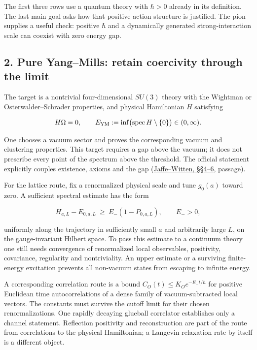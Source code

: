 \documentclass[11pt,a4paper]{article}
\begin{document}
The first three rows use a quantum theory with \(\hbar>0\) already in
its definition. The last main goal asks how that positive action
structure is justified. The pion supplies a useful check: positive
\(\hbar\) and a dynamically generated strong-interaction scale can
coexist with zero energy gap.

\hypertarget{pure-yangmills-retain-coercivity-through-the-limit}{%
\subsection{2. Pure Yang--Mills: retain coercivity through the
limit}\label{pure-yangmills-retain-coercivity-through-the-limit}}

The target is a nontrivial four-dimensional \(SU(3)\) theory with the
Wightman or Osterwalder--Schrader properties, and physical Hamiltonian
\(H\) satisfying

\[H\Omega=0,\qquad
E_{\rm YM}:=\inf\bigl(\operatorname{spec}H\setminus\{0\}\bigr)
\in(0,\infty).\]

One chooses a vacuum sector and proves the corresponding vacuum and
clustering properties. This target requires a gap above the vacuum; it
does not prescribe every point of the spectrum above the threshold. The
official statement explicitly couples existence, axioms and the gap
(\href{https://www.claymath.org/wp-content/uploads/2022/06/yangmills.pdf}{Jaffe--Witten,
§§4--6}, passage).

For the lattice route, fix a renormalized physical scale and tune
\(g_0(a)\) toward zero. A sufficient spectral estimate has the form

\[H_{a,L}-E_{0,a,L}\ \ge\ E_-(1-P_{0,a,L}),\qquad E_->0,\]

uniformly along the trajectory in sufficiently small \(a\) and
arbitrarily large \(L\), on the gauge-invariant Hilbert space. To pass
this estimate to a continuum theory one still needs convergence of
renormalized local observables, positivity, covariance, regularity and
nontriviality. An upper estimate or a surviving finite-energy excitation
prevents all non-vacuum states from escaping to infinite energy.

A corresponding correlation route is a bound
\(C_O(t)\le K_Oe^{-E_-t/\hbar}\) for positive Euclidean time
autocorrelations of a dense family of vacuum-subtracted local vectors.
The constants must survive the cutoff limit for their chosen
renormalizations. One rapidly decaying glueball correlator establishes
only a channel statement. Reflection positivity and reconstruction are
part of the route from correlations to the physical Hamiltonian; a
Langevin relaxation rate by itself is a different object.
\end{document}
